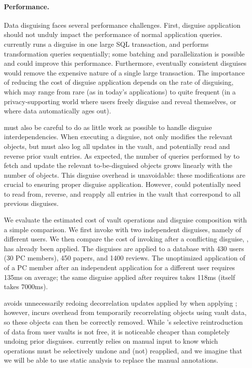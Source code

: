 \paragraph{Performance.}
\label{sec:perf}

Data disguising faces several performance challenges.
%
First, disguise application should not unduly impact the performance of normal application queries.
\sys currently runs a disguise in one large SQL transaction, and performs transformation queries
sequentially; some batching and parallelization is possible and could improve this performance.
Furthermore, eventually consistent disguises would remove the expensive nature of a single large
transaction.  The importance of reducing the cost of disguise application depends on the rate of
disguising, which may range from rare (as in today's applications) to quite frequent (in a
privacy-supporting world where users freely disguise and reveal themselves, or where data
automatically ages out).

%
\sys must also be careful to do as little work as possible to handle disguise interdependencies.
When executing a disguise, \sys not only modifies the relevant objects, but must also
log all updates in the vault, and potentially read and reverse prior vault entries.
%
As expected, the number of queries performed by \sys to fetch and update the relevant to-be-disguised objects
grows linearly with the number of objects. This disguise overhead is unavoidable: these
modifications are crucial to ensuring proper disguise application.
However, \sys could potentially need to read from, reverse, and reapply all entries in the vault
that correspond to all previous disguises.

We evaluate the estimated cost of vault operations and disguise composition with a simple
comparison. We first invoke \sys with two independent disguises, namely \hrtbf of different
users. We then compare the cost of invoking \hrtbf after a conflicting disguise, \hconfanon, has
already been applied.
The disguises are applied to a database with 430 users (30 PC members), 450 papers, and 1400
reviews.
The unoptimized application of \hrtbf of a PC member after an independent \hrtbf application for a
   different user requires 135ms on average;
the same \hrtbf disguise applied after \hconfanon requires takes 118ms (\hconfanon itself takes
   7000ms). 

\sys avoids unnecessarily redoing decorrelation updates applied by \hconfanon when applying \hrtbf;
however, \sys
incurs overhead from temporarily recorrelating objects using vault data, so these
objects can then be correctly removed. 
While \sys's selective reintroduction of data from user vaults is not free, it is noticeable
   cheaper than completely undoing prior disguises.
\sys currently relies on manual input to know which operations must be selectively undone and
(not) reapplied, and we imagine that we will be able to use static analysis to replace the manual annotations.
